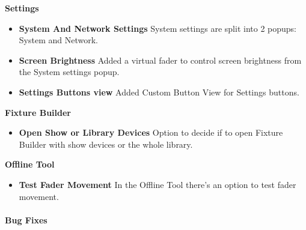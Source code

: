 \documentclass[
]{article}
\providecommand{\tightlist}{%
  \setlength{\itemsep}{0pt}\setlength{\parskip}{0pt}}
\begin{document}
\textbf{Settings}

\begin{itemize}
\item
  \textbf{System And Network Settings} System settings are split into 2 popups: System and Network.
\item
  \textbf{Screen Brightness} Added a virtual fader to control screen brightness from the System settings popup.
\item
  \textbf{Settings Buttons view} Added Custom Button View for Settings buttons.
\end{itemize}

\textbf{Fixture Builder}

\begin{itemize}
\tightlist
\item
  \textbf{Open Show or Library Devices} Option to decide if to open Fixture Builder with show devices or the whole library.
\end{itemize}

\textbf{Offline Tool}

\begin{itemize}
\tightlist
\item
  \textbf{Test Fader Movement} In the Offline Tool there's an option to test fader movement.
\end{itemize}

\hypertarget{bug-fixes-2}{%
\paragraph{Bug Fixes}\label{bug-fixes-2}}
\end{document}
